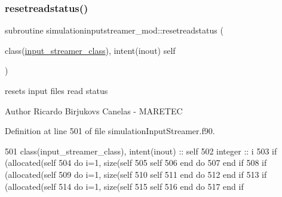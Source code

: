 \subsubsection{\texorpdfstring{resetreadstatus()}{resetreadstatus()}}
{\footnotesize\ttfamily subroutine simulationinputstreamer\+\_\+mod\+::resetreadstatus (\begin{DoxyParamCaption}\item[{class(\mbox{\hyperlink{structsimulationinputstreamer__mod_1_1input__streamer__class}{input\+\_\+streamer\+\_\+class}}), intent(inout)}]{self }\end{DoxyParamCaption})\hspace{0.3cm}{\ttfamily [private]}}



resets input files read status 

\begin{DoxyAuthor}{Author}
Ricardo Birjukovs Canelas -\/ M\+A\+R\+E\+T\+EC 
\end{DoxyAuthor}


Definition at line 501 of file simulation\+Input\+Streamer.\+f90.


\begin{DoxyCode}
501     \textcolor{keywordtype}{class}(input\_streamer\_class), \textcolor{keywordtype}{intent(inout)} :: self
502     \textcolor{keywordtype}{integer} :: i
503     \textcolor{keywordflow}{if} (\textcolor{keyword}{allocated}(self%
504         \textcolor{keywordflow}{do} i=1, \textcolor{keyword}{size}(self%
505             self%
506 \textcolor{keywordflow}{        end do}
507 \textcolor{keywordflow}{    end if}
508     \textcolor{keywordflow}{if} (\textcolor{keyword}{allocated}(self%
509         \textcolor{keywordflow}{do} i=1, \textcolor{keyword}{size}(self%
510             self%
511 \textcolor{keywordflow}{        end do}
512 \textcolor{keywordflow}{    end if}
513     \textcolor{keywordflow}{if} (\textcolor{keyword}{allocated}(self%
514         \textcolor{keywordflow}{do} i=1, \textcolor{keyword}{size}(self%
515             self%
516 \textcolor{keywordflow}{        end do}
517 \textcolor{keywordflow}{    end if}
\end{DoxyCode}
\mbox{\label{namespacesimulationinputstreamer__mod_a9ebef1f85eeb213cf69ea18ca012e047}} 

